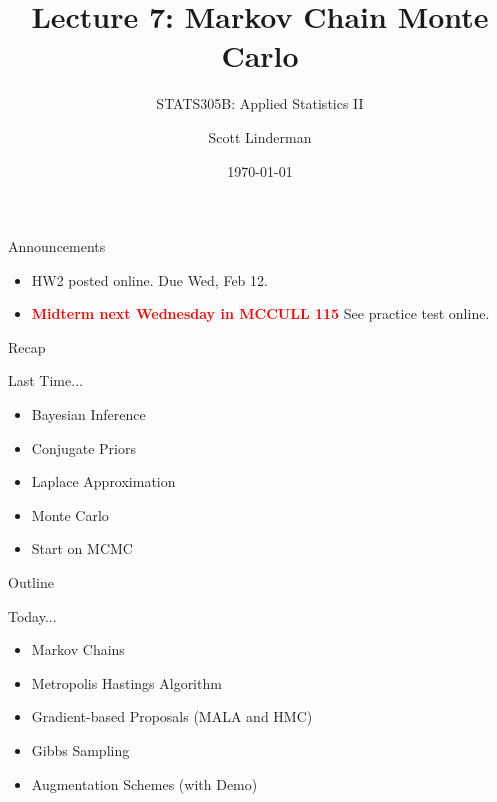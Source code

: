 \documentclass[aspectratio=169]{beamer}
\title{Lecture 7: Markov Chain Monte Carlo}
\subtitle{STATS305B: Applied  Statistics II}
\author{Scott Linderman}
\date{\today}
\begin{document}
\maketitle

\begin{frame}{Announcements}

    \begin{itemize}
        \item HW2 posted online. Due Wed, Feb 12.
        \item \textcolor{red}{\textbf{Midterm next Wednesday in MCCULL 115}} See practice test online.
    \end{itemize}
    
\end{frame}

\begin{frame}{Recap}

    Last Time...
    \begin{itemize}
        \item Bayesian Inference
        \item Conjugate Priors
        \item Laplace Approximation
        \item Monte Carlo
        \item Start on MCMC
    \end{itemize}
    
\end{frame}

\begin{frame}{Outline}

  Today...
  \begin{itemize}
      \item Markov Chains
      \item Metropolis Hastings Algorithm
      \item Gradient-based Proposals (MALA and HMC)
      \item Gibbs Sampling
      \item Augmentation Schemes (with Demo)
  \end{itemize}
  
\end{frame}
    
\end{document}
